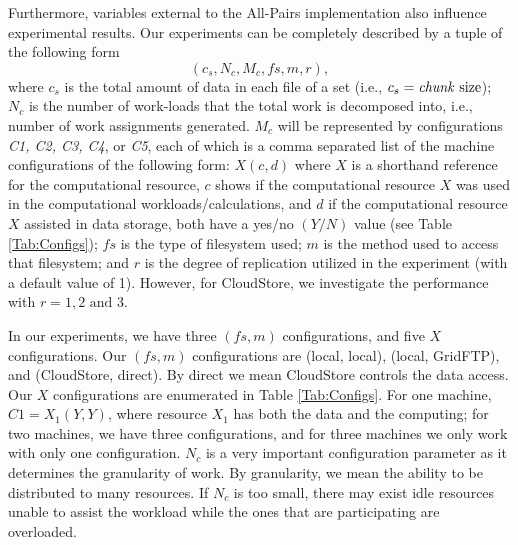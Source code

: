\documentclass{rspublic}
\begin{document}
Furthermore, variables external to the All-Pairs implementation also
influence experimental results. Our experiments can be
completely described by a tuple of the following form
 \begin{equation}
(c_s, N_c, M_c, f\!s, m,r),
\label{Eq:tuple}
\end{equation}
where $c_s$ is the total amount of data in each file of a set (i.e.,
$c_s=\mbox{\textit{chunk} size}$); $N_c$ is the number of work-loads
that the total work is decomposed into, i.e., number of work assignments
generated. $M_c$ will be
represented by configurations \textit{C1, C2, C3, C4}, or \textit{C5}, each of
which is a comma separated list of the machine configurations of the
following form: $X(c, d)$ where $X$ is a shorthand reference for the
computational resource, $c$ shows if the computational resource $X$ was
used in the computational workloads/calculations, and $d$ if the
computational resource $X$ assisted in data storage, both have a yes/no
$(Y/N)$ value (see Table \ref{Tab:Configs}); $f\!s$ is the type of
filesystem used; $m$ is the method used to access that filesystem; and
$r$ is the degree of replication utilized in the experiment (with a
default value of 1). However, for CloudStore, we investigate the
performance with $r = 1, 2
\mbox{ and } 3$.

In our experiments, we have three $(f\!s, m)$ configurations, and five
$X$ configurations. Our $(f\!s, m)$ configurations are (local, local),
(local, GridFTP), and (CloudStore, direct). By direct we mean CloudStore
controls the data access. Our $X$ configurations are enumerated in Table
\ref{Tab:Configs}. For one machine, $\textit{C1}=X_1(Y,Y)$, where resource $X_1$
has both the data and the computing; for two machines, we have three
configurations, and for three machines we only work with only one
configuration. $N_c$ is a very important configuration parameter as it
determines the granularity of work. By granularity, we mean the ability
to be distributed to many resources. If $N_c$ is too small, there may
exist idle resources unable to assist the workload while the ones that
are participating are overloaded.
\end{document}
